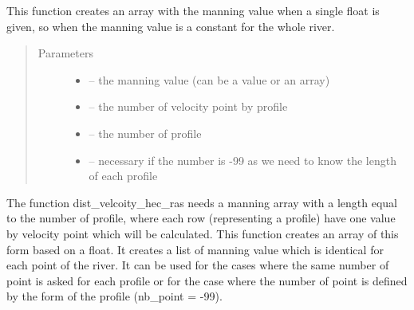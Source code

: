 \documentclass[letterpaper,10pt,english]{sphinxmanual}
\begin{document}
\begin{fulllineitems}
\label{\detokenize{index:src.dist_vistess2.get_manning}}
This function creates an array with the manning value when a single float is given, so when the manning value
is a constant for the whole river.
\begin{quote}\begin{description}
\item[{Parameters}] \leavevmode\begin{itemize}
\item {} 
 -- the manning value (can be a value or an array)

\item {} 
 -- the number of velocity point by profile

\item {} 
 -- the number of profile

\item {} 
 -- necessary if the number is -99 as we need to know the length of each profile

\end{itemize}

\end{description}\end{quote}


The function dist\_velcoity\_hec\_ras needs a manning array with a length equal to the number of profile, where each
row (representing a profile) have one value by velocity point which will be calculated. This function creates an
array of this form based on a float. It creates a list of manning value which is identical for each point of the
river. It can be used for the cases where the same number of point is asked for each profile or for the case where
the number of point is defined by the form of the profile (nb\_point = -99).

\end{fulllineitems}

\end{document}
